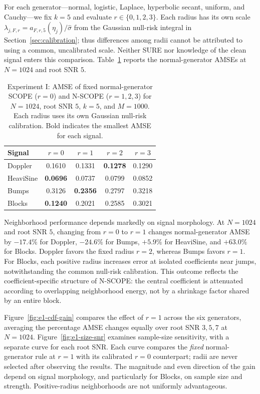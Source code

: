 \documentclass[12pt]{article}
\theoremstyle{definition}
\theoremstyle{definition}
\begin{document}
For each generator---normal, logistic, Laplace, hyperbolic secant,
uniform, and Cauchy---we fix $k=5$ and evaluate
$r\in\{0,1,2,3\}$. Each radius has its own scale
$\lambda_{j,F,r}=a_{F,r,5}(\eta_j)/\widehat\sigma$ from the
Gaussian null-risk integral in Section~\ref{sec:calibration}; thus
differences among radii cannot be attributed to using a common,
uncalibrated scale. Neither SURE nor knowledge of the clean signal
enters this comparison. Table~\ref{tab:e1-normal} reports the
normal-generator AMSEs at $N=1024$ and root SNR $5$.

\begin{table}[tbp]
\centering\small
\caption{Experiment I: AMSE of fixed normal-generator SCOPE ($r=0$) and
N-SCOPE ($r=1,2,3$) for $N=1024$, root SNR $5$, $k=5$, and $M=1000$.
Each radius uses its own Gaussian null-risk calibration. Bold indicates
the smallest AMSE for each signal.}
\label{tab:e1-normal}
\setlength{\tabcolsep}{5pt}
\begin{tabular}{lcccc}
\toprule
Signal & $r=0$ & $r=1$ & $r=2$ & $r=3$ \\
\midrule
Doppler & 0.1610 & 0.1331 & \textbf{0.1278} & 0.1290 \\
HeaviSine & \textbf{0.0696} & 0.0737 & 0.0799 & 0.0852 \\
Bumps & 0.3126 & \textbf{0.2356} & 0.2797 & 0.3218 \\
Blocks & \textbf{0.1240} & 0.2021 & 0.2585 & 0.3021 \\
\bottomrule
\end{tabular}
\end{table}

Neighborhood performance depends markedly on signal morphology.
At $N=1024$ and root SNR $5$, changing from $r=0$ to $r=1$
changes normal-generator AMSE by $-17.4\%$ for Doppler,
$-24.6\%$ for Bumps, $+5.9\%$ for HeaviSine, and
$+63.0\%$ for Blocks. Doppler favors the fixed radius $r=2$,
whereas Bumps favors $r=1$. For Blocks, each positive radius
increases error at isolated coefficients near jumps, notwithstanding
the common null-risk calibration. This outcome reflects the
coefficient-specific structure of N-SCOPE: the central coefficient
is attenuated according to overlapping neighborhood energy, not
by a shrinkage factor shared by an entire block.

Figure~\ref{fig:e1-cdf-gain} compares the effect of $r=1$
across the six generators, averaging the percentage AMSE changes
equally over root SNR $3,5,7$ at $N=1024$.
Figure~\ref{fig:e1-size-snr} examines sample-size sensitivity,
with a separate curve for each root SNR. Each curve compares the
\emph{fixed} normal-generator rule at $r=1$ with its calibrated
$r=0$ counterpart; radii are never selected after observing the
results. The magnitude and even direction of the gain depend on
signal morphology, and particularly for Blocks, on sample size
and strength. Positive-radius neighborhoods are not uniformly
advantageous.
\end{document}

